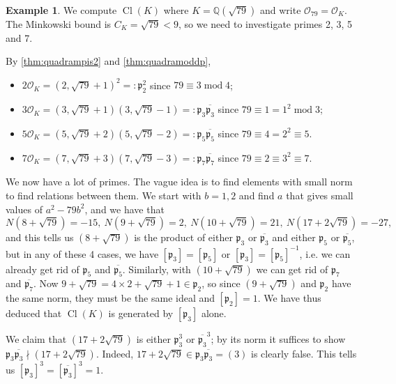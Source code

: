 \documentclass{article}
\newcommand{\Q}{\mathbb{Q}}
\newcommand{\Mod}{\operatorname{mod}}
\newcommand{\Cl}{\operatorname{Cl}}
\newcommand{\ri}{\mathcal{O}}
\newcommand{\ip}{\mathfrak{p}}
\theoremstyle{definition}
\newtheorem{example}[defn]{Example}
\begin{document}
\begin{example}
We compute $\Cl(K)$ where $K=\Q\left(\sqrt{79}\right)$ and write $\ri_{79}=\ri_K$. The Minkowski bound is $C_K=\sqrt{79}<9$, so we need to investigate primes 2, 3, 5 and 7.

By \ref{thm:quadrampis2} and \ref{thm:quadramoddp},
\begin{itemize}
\item $2\ri_K=\left(2,\sqrt{79}+1\right)^2=:\ip_2^2$ since $79\equiv 3\Mod 4$;
\item $3\ri_K=\left(3,\sqrt{79}+1\right)\left(3,\sqrt{79}-1\right)=:\ip_3\overline{\ip_3}$ since $79\equiv 1=1^2\Mod 3$;
\item $5\ri_K=\left(5,\sqrt{79}+2\right)\left(5,\sqrt{79}-2\right)=:\ip_5\overline{\ip_5}$ since $79\equiv 4=2^2\equiv 5$.
\item $7\ri_K=\left(7,\sqrt{79}+3\right)\left(7,\sqrt{79}-3\right)=:\ip_7\overline{\ip_7}$ since $79\equiv 2\equiv 3^2\equiv 7$.
\end{itemize}
We now have a lot of primes. The vague idea is to find elements with small norm to find relations between them. We start with $b=1,2$ and find $a$ that gives small values of $a^2-79b^2$, and we have that
\[
N\left(8+\sqrt{79}\right)=-15,\ N\left(9+\sqrt{79}\right)=2,\ N\left(10+\sqrt{79}\right)=21,\ N\left(17+2\sqrt{79}\right)=-27,
\]
and this tells us $\left(8+\sqrt{79}\right)$ is the product of either $\ip_3$ or $\overline{\ip_3}$ and either $\ip_5$ or $\overline{\ip_5}$, but in any of these 4 cases, we have $[\ip_3]=[\ip_5]$ or $[\ip_3]=[\ip_5]^{-1}$, i.e. we can already get rid of $\ip_5$ and $\overline{\ip_5}$. Similarly, with $\left(10+\sqrt{79}\right)$ we can get rid of $\ip_7$ and $\overline{\ip_7}$. Now $9+\sqrt{79}=4\times 2+\sqrt{79}+1\in\ip_2$, so since $\left(9+\sqrt{79}\right)$ and $\ip_2$ have the same norm, they must be the same ideal and $[\ip_2]=1$. We have thus deduced that $\Cl(K)$ is generated by $[\ip_3]$ alone.

We claim that $\left(17+2\sqrt{79}\right)$ is either $\ip_3^3$ or $\overline{\ip_3}^3$; by its norm it suffices to show $\ip_3\overline{\ip_3}\nmid \left(17+2\sqrt{79}\right)$. Indeed, $17+2\sqrt{79}\in\ip_3\overline{\ip_3}=(3)$ is clearly false. This tells us $[\ip_3]^3=[\overline{\ip_3}]^3=1$.


\end{example}
\end{document}
